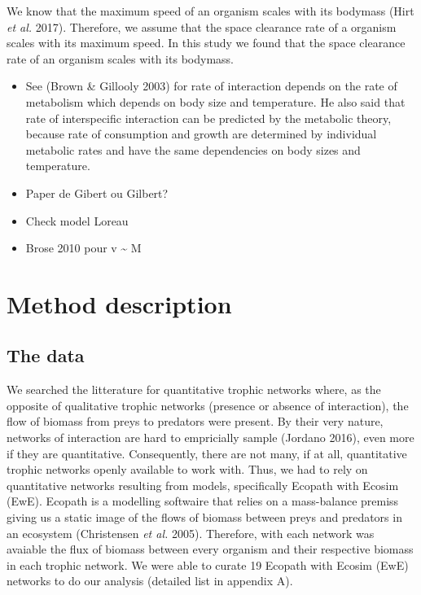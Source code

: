 \documentclass[10pt,oneside]{article}
\begin{document}
We know that the maximum speed of an organism scales with its bodymass
(Hirt \emph{et al.} 2017). Therefore, we assume that the space clearance
rate of a organism scales with its maximum speed. In this study we found
that the space clearance rate of an organism scales with its bodymass.

\begin{itemize}
\item
  See (Brown \& Gillooly 2003) for rate of interaction depends on the
  rate of metabolism which depends on body size and temperature. He also
  said that rate of interspecific interaction can be predicted by the
  metabolic theory, because rate of consumption and growth are
  determined by individual metabolic rates and have the same
  dependencies on body sizes and temperature.
\item
  Paper de Gibert ou Gilbert?
\item
  Check model Loreau
\item
  Brose 2010 pour v \textasciitilde{} M
\end{itemize}

\hypertarget{method-description}{%
\section{Method description}\label{method-description}}

\hypertarget{the-data}{%
\subsection{The data}\label{the-data}}

We searched the litterature for quantitative trophic networks where, as
the opposite of qualitative trophic networks (presence or absence of
interaction), the flow of biomass from preys to predators were present.
By their very nature, networks of interaction are hard to empricially
sample (Jordano 2016), even more if they are quantitative. Consequently,
there are not many, if at all, quantitative trophic networks openly
available to work with. Thus, we had to rely on quantitative networks
resulting from models, specifically Ecopath with Ecosim (EwE). Ecopath
is a modelling softwaire that relies on a mass-balance premiss giving us
a static image of the flows of biomass between preys and predators in an
ecosystem (Christensen \emph{et al.} 2005). Therefore, with each network
was avaiable the flux of biomass between every organism and their
respective biomass in each trophic network. We were able to curate 19
Ecopath with Ecosim (EwE) networks to do our analysis (detailed list in
appendix A).
\end{document}
